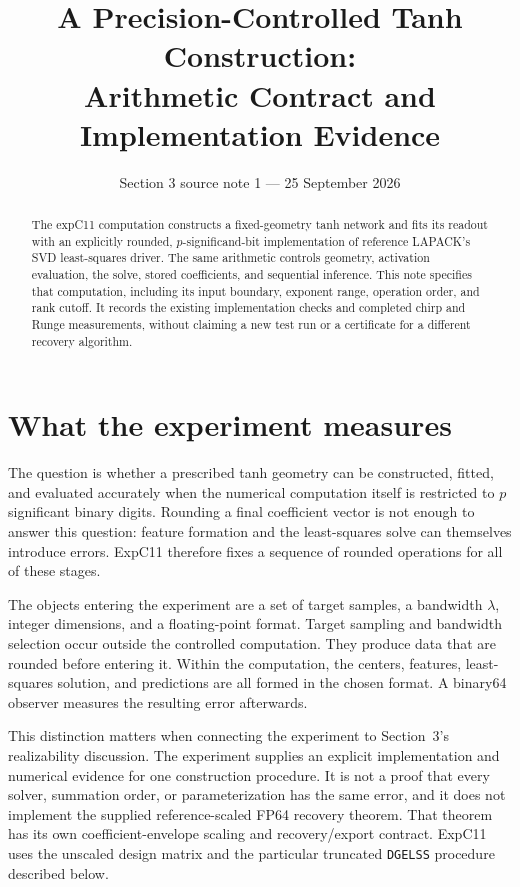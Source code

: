 \documentclass[11pt]{article}
\title{A Precision-Controlled Tanh Construction:\\Arithmetic Contract and Implementation Evidence}
\author{}\date{Section 3 source note 1 --- 25 September 2026}
\newcommand{\code}[1]{\texttt{#1}}
\begin{document}
\maketitle

\begin{abstract}
The expC11 computation constructs a fixed-geometry tanh network and fits its
readout with an explicitly rounded, $p$-significand-bit implementation of
reference LAPACK's SVD least-squares driver. The same arithmetic controls
geometry, activation evaluation, the solve, stored coefficients, and sequential
inference. This note specifies that computation, including its input boundary,
exponent range, operation order, and rank cutoff. It records the existing
implementation checks and completed chirp and Runge measurements, without
claiming a new test run or a certificate for a different recovery algorithm.
\end{abstract}

\section{What the experiment measures}

The question is whether a prescribed tanh geometry can be constructed, fitted,
and evaluated accurately when the numerical computation itself is restricted
to $p$ significant binary digits. Rounding a final coefficient vector is not
enough to answer this question: feature formation and the least-squares solve
can themselves introduce errors. ExpC11 therefore fixes a sequence of rounded
operations for all of these stages.

The objects entering the experiment are a set of target samples, a bandwidth
$\lambda$, integer dimensions, and a floating-point format. Target sampling
and bandwidth selection occur outside the controlled computation. They produce
data that are rounded before entering it. Within the computation, the centers,
features, least-squares solution, and predictions are all formed in the chosen
format. A binary64 observer measures the resulting error afterwards.

This distinction matters when connecting the experiment to Section~3's
realizability discussion. The experiment supplies an explicit implementation
and numerical evidence for one construction procedure. It is not a proof that
every solver, summation order, or parameterization has the same error, and it
does not implement the supplied reference-scaled FP64 recovery theorem. That
theorem has its own coefficient-envelope scaling and recovery/export contract.
ExpC11 uses the unscaled design matrix and the particular truncated
\code{DGELSS} procedure described below.
\end{document}
